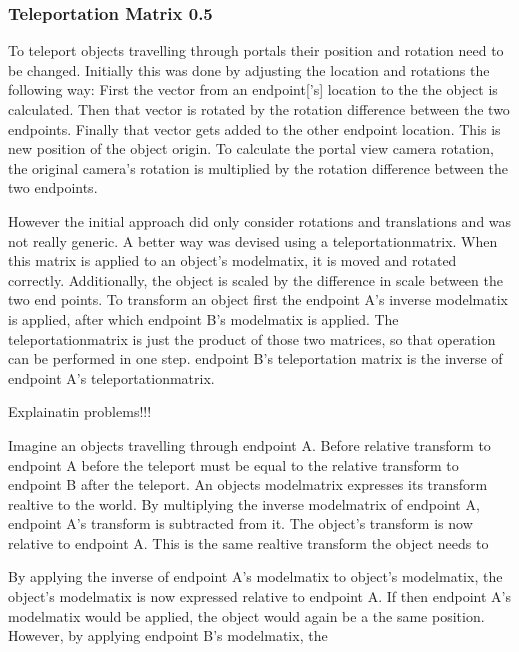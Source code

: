 \subsubsection{Teleportation Matrix 0.5}
\label{section:teleportationmatrix}
To teleport objects travelling through portals their position and rotation need to be changed. Initially this was done by adjusting the location and rotations the following way: First the vector from an \gls{endpoint}['s] location to the the object is calculated. Then that vector is rotated by the rotation difference between the two endpoints. Finally that vector gets added to the other endpoint location. This is new position of the object origin. To calculate the portal view camera rotation, the original camera's rotation is multiplied by the rotation difference between the two endpoints. 

However the initial approach did only consider rotations and translations and was not really generic. A better way was devised using a \gls{teleportationmatrix}. When this matrix is applied to an object's \gls{modelmatix}, it is moved and rotated correctly. Additionally, the object is scaled by the difference in scale between the two end points. To transform an object first the \gls{endpoint} A's inverse \gls{modelmatix} is applied, after which \gls{endpoint} B's \gls{modelmatix} is applied. The \gls{teleportationmatrix} is just the product of those two matrices, so that operation can be performed in one step. \Gls{endpoint} B's teleportation matrix is the inverse of \gls{endpoint} A's \gls{teleportationmatrix}.



{\Huge Explainatin problems!!!}

Imagine an objects travelling through \gls{endpoint} A. Before relative transform to \gls{endpoint} A before the teleport must be equal to the relative transform to \gls{endpoint} B after the teleport. An objects modelmatrix expresses its transform realtive to the world. By multiplying the inverse modelmatrix of \gls{endpoint} A, \gls{endpoint} A's transform is subtracted from it. The object's transform is now relative to \gls{endpoint} A. This is the same realtive transform the object needs to

By applying the inverse of \gls{endpoint} A's \gls{modelmatix} to object's \gls{modelmatix}, the \gls{object}'s \gls{modelmatix} is now expressed relative to \gls{endpoint} A. If then \gls{endpoint} A's \gls{modelmatix} would be applied, the object would again be a the same position. However, by applying \gls{endpoint} B's \gls{modelmatix}, the \



